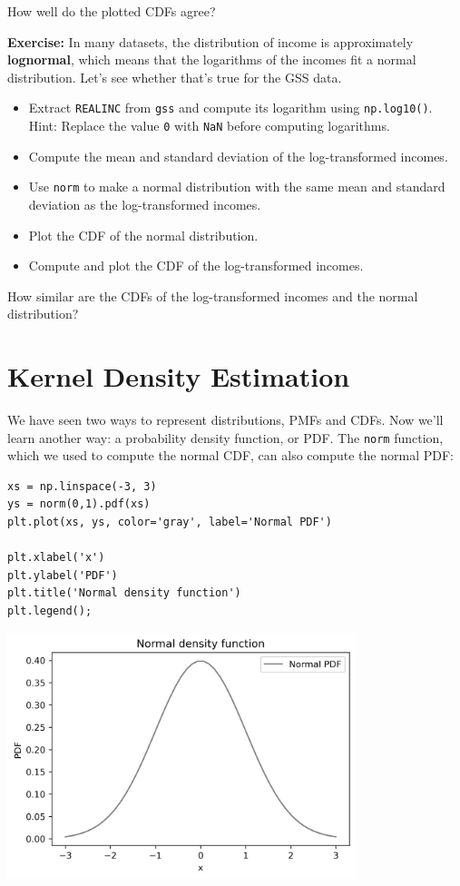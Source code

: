 How well do the plotted CDFs agree?

\textbf{Exercise:} In many datasets, the distribution of income is
approximately \textbf{lognormal}, which means that the logarithms of the
incomes fit a normal distribution. Let's see whether that's true for the
GSS data.

\begin{itemize}
\item
  Extract \passthrough{\lstinline!REALINC!} from
  \passthrough{\lstinline!gss!} and compute its logarithm using
  \passthrough{\lstinline!np.log10()!}. Hint: Replace the value
  \passthrough{\lstinline!0!} with \passthrough{\lstinline!NaN!} before
  computing logarithms.
\item
  Compute the mean and standard deviation of the log-transformed
  incomes.
\item
  Use \passthrough{\lstinline!norm!} to make a normal distribution with
  the same mean and standard deviation as the log-transformed incomes.
\item
  Plot the CDF of the normal distribution.
\item
  Compute and plot the CDF of the log-transformed incomes.
\end{itemize}

How similar are the CDFs of the log-transformed incomes and the normal
distribution?

\hypertarget{kernel-density-estimation}{%
\section{Kernel Density Estimation}\label{kernel-density-estimation}}

We have seen two ways to represent distributions, PMFs and CDFs. Now
we'll learn another way: a probability density function, or PDF. The
\passthrough{\lstinline!norm!} function, which we used to compute the
normal CDF, can also compute the normal PDF:

\begin{lstlisting}[]
xs = np.linspace(-3, 3)
ys = norm(0,1).pdf(xs)
plt.plot(xs, ys, color='gray', label='Normal PDF')

plt.xlabel('x')
plt.ylabel('PDF')
plt.title('Normal density function')
plt.legend();
\end{lstlisting}

\begin{center}
\includegraphics[width=4in]{chapters/08_distributions_files/08_distributions_118_0.png}
\end{center}

